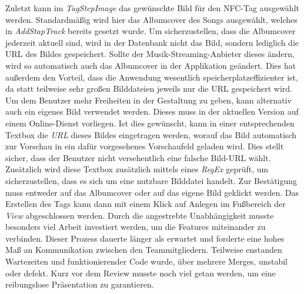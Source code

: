 \documentclass[10pt, a4paper]{article}
\begin{document}
\begin{onehalfspace}
Zuletzt kann im \textit{TagStepImage} das gewünschte Bild für den NFC-Tag ausgewählt werden.
Standardmäßig wird hier das Albumcover des Songs ausgewählt, welches in \textit{AddStapTrack} bereits gesetzt wurde.
Um sicherzustellen, dass die Albumcover jederzeit aktuell sind, wird in der Datenbank nicht das Bild, sondern lediglich die URL des Bildes gespeichert.
Sollte der Musik-Streaming-Anbieter dieses ändern, wird so automatisch auch das Albumcover in der Applikation geändert.
Dies hat außerdem den Vorteil, dass die Anwendung wesentlich speicherplatzeffizienter ist, da statt teilweise sehr großen Bilddateien jeweils nur die URL gespeichert wird.
Um dem Benutzer mehr Freiheiten in der Gestaltung zu geben, kann alternativ auch ein eigenes Bild verwendet werden.
Dieses muss in der aktuellen Version auf einem Online-Dienst vorliegen.
Ist dies gewünscht, kann in einer entsprechenden Textbox die \textit{URL} dieses Bildes eingetragen werden, worauf das Bild automatisch zur Vorschau in ein dafür vorgesehenes Vorschaufeld geladen wird.
Dies stellt sicher, dass der Benutzer nicht versehentlich eine falsche Bild-URL wählt.
Zusätzlich wird diese Textbox zusätzlich mittels eines \textit{RegEx} geprüft, um sicherzustellen, dass es sich um eine nutzbare Bilddatei handelt.
Zur Bestätigung muss entweder auf das Albumcover oder auf das eigene Bild geklickt werden.
Das Erstellen des Tags kann dann mit einem Klick auf \glqq Anlegen\grqq{} im Fußbereich der \textit{View} abgeschlossen werden.
Durch die angestrebte Unabhängigkeit musste besonders viel Arbeit investiert werden, um die Features miteinander zu verbinden.
Dieser Prozess dauerte länger als erwartet und forderte eine hohes Maß an Kommunikation zwischen den Teammitgliedern.
Teilweise enstanden Wartezeiten und funktionierender Code wurde, über mehrere Merges, unstabil oder defekt.
Kurz vor dem Review musste noch viel getan werden, um eine reibungslose Präsentation zu garantieren.


\end{onehalfspace}
\end{document}
